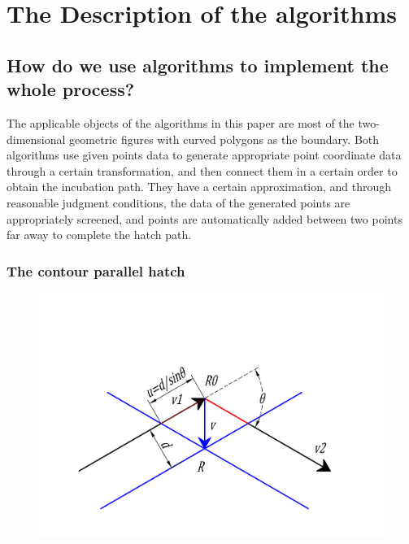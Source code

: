 \documentclass{apmcmthesis}
\begin{document}
\section{The Description of the algorithms}


\subsection{How do we use algorithms to implement the whole process?}

The applicable objects of the algorithms in this paper are most of the two-dimensional geometric figures with curved polygons as the boundary. Both algorithms use given points data to generate appropriate point coordinate data through a certain transformation, and then connect them in a certain order to obtain the incubation path. They have a certain approximation, and through reasonable judgment conditions, the data of the generated points are appropriately screened, and points are automatically added between two points far away to complete the hatch path.



\subsubsection{The contour parallel hatch}

\begin{figure}[!ht]
  \centering
  \includegraphics[width=12cm]{v}
  \caption{}
\end{figure}
\end{document}
